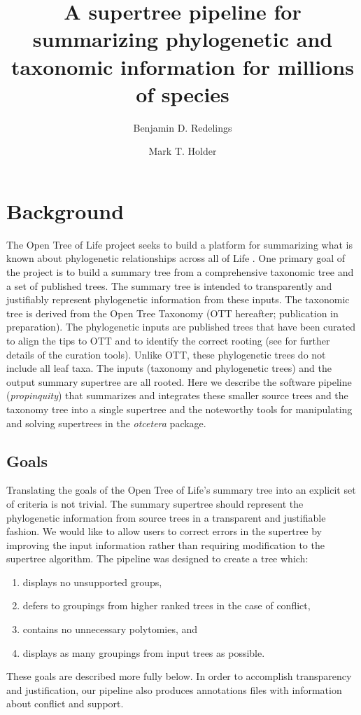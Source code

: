 \documentclass[fleqn,12pt,lineno,english]{wlpeerj}
\title{A supertree pipeline for summarizing phylogenetic and taxonomic information
for millions of species}
\author[1,2]{Benjamin D. Redelings}
\author[2,3,4]{Mark T. Holder}
\affil[1]{Department of Biology, Duke University, Durham NC, US}
\affil[2]{Department of Ecology and Evolutionary Biology, University of Kansas, Lawrence KS, US}
\affil[3]{Biodiversity Institute, University of Kansas, Lawrence KS, US}
\affil[4]{Heidelberg Institute for Theoretical Studies, Heidelberg, Germany}
\begin{document}
\flushbottom
\maketitle
\thispagestyle{empty}



\section{Background}

The Open Tree of Life project seeks to build a platform for summarizing
what is known about phylogenetic relationships across all of Life
\citep{HinchliffEtAl2015}. One primary goal of the project is to
build a summary tree from a comprehensive taxonomic tree and a set
of published trees. The summary tree is intended to transparently
and justifiably represent phylogenetic information from these inputs.
The taxonomic tree is derived from the Open Tree Taxonomy (OTT hereafter;
publication in preparation). The phylogenetic inputs are published
trees that have been curated to align the tips to OTT and to identify
the correct rooting (see \citealt{McTavishEtAt2015} for further details
of the curation tools). Unlike OTT, these phylogenetic trees do not
include all leaf taxa. The inputs (taxonomy and phylogenetic trees)
and the output summary supertree are all rooted. Here we describe
the software pipeline (\emph{propinquity}) that summarizes and integrates
these smaller source trees and the taxonomy tree into a single supertree
and the noteworthy tools for manipulating and solving supertrees in
the \emph{otcetera} package.

\subsection{Goals}

Translating the goals of the Open Tree of Life's summary tree into
an explicit set of criteria is not trivial. The summary supertree
should represent the phylogenetic information from source trees in
a transparent and justifiable fashion. We would like to allow users
to correct errors in the supertree by improving the input information
rather than requiring modification to the supertree algorithm. The
pipeline was designed to create a tree which:
\begin{enumerate}
\item displays no unsupported groups,
\item defers to groupings from higher ranked trees in the case of conflict, 
\item contains no unnecessary polytomies, and
\item displays as many groupings from input trees as possible.
\end{enumerate}
These goals are described more fully below. In order to accomplish
transparency and justification, our pipeline also produces annotations
files with information about conflict and support.
\end{document}
